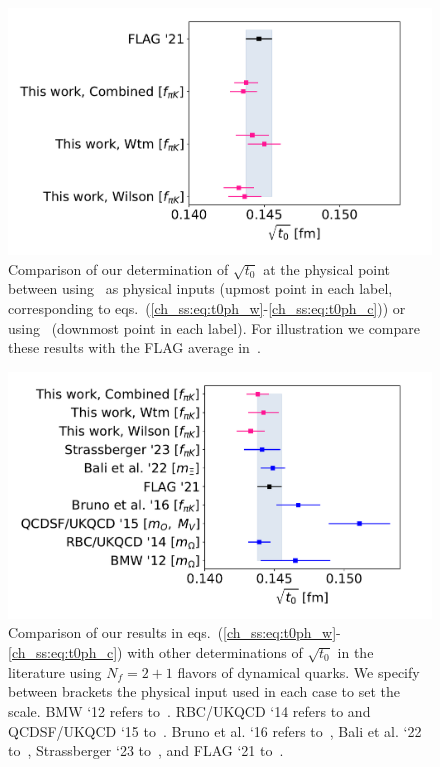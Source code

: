 \begin{figure}
    \centering
    \includegraphics[width=1.\textwidth]{./cap5/figs/t0_compar_FLAG.pdf}
    \caption{Comparison of our determination of $\sqrt{t_0}$ at the physical point between using~\citep{FlavourLatticeAveragingGroupFLAG:2021npn} as physical inputs (upmost point in each label, corresponding to eqs.~(\ref{ch_ss:eq:t0ph_w}-\ref{ch_ss:eq:t0ph_c})) or using~\citep{FLAG16} (downmost point in each label). For illustration we compare these results with the FLAG average in~\citep{FlavourLatticeAveragingGroupFLAG:2021npn}.}
    \label{ch_ss:fig:FLAG}
\end{figure}

\begin{figure}
    \centering
    \includegraphics[width=1.\textwidth]{./cap5/figs/t0_compar.pdf}
    \caption{Comparison of our results in eqs.~(\ref{ch_ss:eq:t0ph_w}-\ref{ch_ss:eq:t0ph_c}) with other determinations of $\sqrt{t_0}$ in the literature using $N_f=2+1$ flavors of dynamical quarks. We specify between brackets the physical input used in each case to set the scale. BMW `12 refers to~\citep{BMW:2012hcm}. RBC/UKQCD `14 refers to \citep{UK14} and QCDSF/UKQCD `15 to~\citep{UK15}. Bruno et al. `16 refers to~\citep{Bruno:2016plf}, Bali et al. `22 to~\citep{RQCD_scale}, Strassberger `23 to~\citep{Strassberger:2023xnj}, and FLAG `21 to~\citep{FlavourLatticeAveragingGroupFLAG:2021npn}.}
    \label{ch_ss:fig:t0_compar}
\end{figure}

